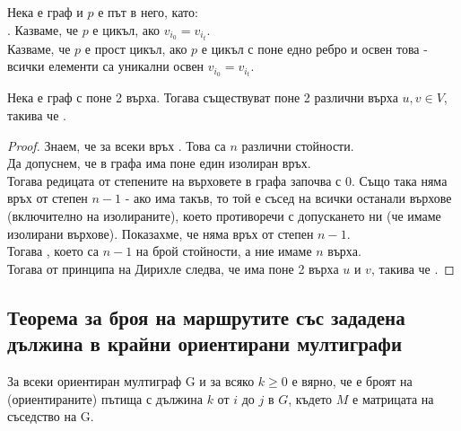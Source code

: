\begin{definition}
    Нека \graf е граф и \(p\) е път в него, като: \\
    . 
    Казваме, че \(p\) е цикъл, ако \(v_{i_0} = v_{i_t}\). \\
    Казваме, че \(p\) е прост цикъл, ако \(p\) е цикъл с поне едно ребро и освен това - всички елементи 
    са уникални освен \(v_{i_0} = v_{i_t}\).
\end{definition}

\begin{lemma}
    Нека \graf е граф с поне 2 върха. Тогава съществуват поне 2 различни върха \(u, v \in V\), такива че 
    .
\end{lemma}
\begin{proof}
    Знаем, че за всеки връх . Това са \(n\) различни стойности. \\
    Да допуснем, че в графа има поне един изолиран връх. \\
    Тогава редицата от степените на върховете в графа започва с 0.
    Също така няма връх от степен \(n - 1\) - ако има такъв, то той е съсед на всички останали 
    върхове (включително на изолираните), което противоречи с допускането ни (че имаме изолирани върхове). 
    Показахме, че няма връх от степен \(n - 1\). \\
    Тогава , което са \(n - 1\) на брой стойности, 
    а ние имаме \(n\) върха. \\
    Тогава от принципа на Дирихле следва, че има поне 2 върха \(u\) и \(v\), такива че .
\end{proof}

\subsection*{Теорема за броя на маршрутите със зададена дължина в крайни ориентирани мултиграфи}
\begin{theorem}
    За всеки ориентиран мултиграф G и за всяко \(k \ge 0\) е вярно, че  е броят на 
    (ориентираните) пътища с дължина \(k\) от \(i\) до \(j\) в \(G\), където \(M\) е матрицата на 
    съседство на G. 
\end{theorem}

